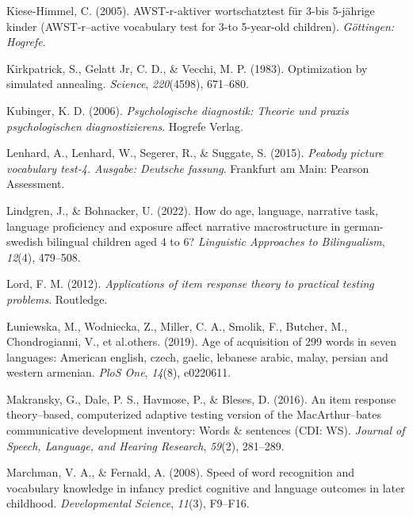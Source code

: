 \documentclass[
  man,floatsintext]{apa6}
\newlength{\cslhangindent}
\newlength{\cslentryspacingunit} %
\newenvironment{CSLReferences}[2] %
 {%
  \setlength{\parindent}{0pt}
  \ifodd #1
  \let\oldpar\par
  \def\par{\hangindent=\cslhangindent\oldpar}
  \fi
  \setlength{\parskip}{#2\cslentryspacingunit}
 }%
 {}
\begin{document}
\begin{CSLReferences}{1}{0}
\leavevmode{}%
Kiese-Himmel, C. (2005). AWST-r-aktiver wortschatztest f{ü}r 3-bis 5-j{ä}hrige kinder (AWST-r--active vocabulary test for 3-to 5-year-old children). \emph{G{ö}ttingen: Hogrefe}.

\leavevmode{}%
Kirkpatrick, S., Gelatt Jr, C. D., \& Vecchi, M. P. (1983). Optimization by simulated annealing. \emph{Science}, \emph{220}(4598), 671--680.

\leavevmode{}%
Kubinger, K. D. (2006). \emph{Psychologische diagnostik: Theorie und praxis psychologischen diagnostizierens}. Hogrefe Verlag.

\leavevmode{}%
Lenhard, A., Lenhard, W., Segerer, R., \& Suggate, S. (2015). \emph{Peabody picture vocabulary test-4. Ausgabe: Deutsche fassung}. Frankfurt am Main: Pearson Assessment.

\leavevmode{}%
Lindgren, J., \& Bohnacker, U. (2022). How do age, language, narrative task, language proficiency and exposure affect narrative macrostructure in german-swedish bilingual children aged 4 to 6? \emph{Linguistic Approaches to Bilingualism}, \emph{12}(4), 479--508.

\leavevmode{}%
Lord, F. M. (2012). \emph{Applications of item response theory to practical testing problems}. Routledge.

\leavevmode{}%
Łuniewska, M., Wodniecka, Z., Miller, C. A., Smolik, F., Butcher, M., Chondrogianni, V., et al.others. (2019). Age of acquisition of 299 words in seven languages: American english, czech, gaelic, lebanese arabic, malay, persian and western armenian. \emph{PloS One}, \emph{14}(8), e0220611.

\leavevmode{}%
Makransky, G., Dale, P. S., Havmose, P., \& Bleses, D. (2016). An item response theory--based, computerized adaptive testing version of the MacArthur--bates communicative development inventory: Words \& sentences (CDI: WS). \emph{Journal of Speech, Language, and Hearing Research}, \emph{59}(2), 281--289.

\leavevmode{}%
Marchman, V. A., \& Fernald, A. (2008). Speed of word recognition and vocabulary knowledge in infancy predict cognitive and language outcomes in later childhood. \emph{Developmental Science}, \emph{11}(3), F9--F16.


\end{CSLReferences}
\end{document}
